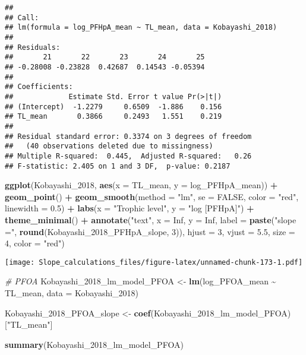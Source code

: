 \documentclass[
]{article}
\newenvironment{Shaded}{\begin{snugshade}}{\end{snugshade}}
\newcommand{\AttributeTok}[1]{\textcolor[rgb]{0.13,0.29,0.53}{#1}}
\newcommand{\CommentTok}[1]{\textcolor[rgb]{0.56,0.35,0.01}{\textit{#1}}}
\newcommand{\ConstantTok}[1]{\textcolor[rgb]{0.56,0.35,0.01}{#1}}
\newcommand{\DecValTok}[1]{\textcolor[rgb]{0.00,0.00,0.81}{#1}}
\newcommand{\FloatTok}[1]{\textcolor[rgb]{0.00,0.00,0.81}{#1}}
\newcommand{\FunctionTok}[1]{\textcolor[rgb]{0.13,0.29,0.53}{\textbf{#1}}}
\newcommand{\NormalTok}[1]{#1}
\newcommand{\OtherTok}[1]{\textcolor[rgb]{0.56,0.35,0.01}{#1}}
\newcommand{\SpecialCharTok}[1]{\textcolor[rgb]{0.81,0.36,0.00}{\textbf{#1}}}
\newcommand{\StringTok}[1]{\textcolor[rgb]{0.31,0.60,0.02}{#1}}
\begin{document}
\begin{verbatim}
## 
## Call:
## lm(formula = log_PFHpA_mean ~ TL_mean, data = Kobayashi_2018)
## 
## Residuals:
##       21       22       23       24       25 
## -0.28008 -0.23828  0.42687  0.14543 -0.05394 
## 
## Coefficients:
##             Estimate Std. Error t value Pr(>|t|)
## (Intercept)  -1.2279     0.6509  -1.886    0.156
## TL_mean       0.3866     0.2493   1.551    0.219
## 
## Residual standard error: 0.3374 on 3 degrees of freedom
##   (40 observations deleted due to missingness)
## Multiple R-squared:  0.445,  Adjusted R-squared:   0.26 
## F-statistic: 2.405 on 1 and 3 DF,  p-value: 0.2187
\end{verbatim}

\begin{Shaded}
\begin{Highlighting}[]
\FunctionTok{ggplot}\NormalTok{(Kobayashi\_2018, }\FunctionTok{aes}\NormalTok{(}\AttributeTok{x =}\NormalTok{ TL\_mean, }\AttributeTok{y =}\NormalTok{ log\_PFHpA\_mean)) }\SpecialCharTok{+}
  \FunctionTok{geom\_point}\NormalTok{() }\SpecialCharTok{+}
  \FunctionTok{geom\_smooth}\NormalTok{(}\AttributeTok{method =} \StringTok{"lm"}\NormalTok{, }\AttributeTok{se =} \ConstantTok{FALSE}\NormalTok{, }\AttributeTok{color =} \StringTok{"red"}\NormalTok{, }\AttributeTok{linewidth =} \FloatTok{0.5}\NormalTok{) }\SpecialCharTok{+}
  \FunctionTok{labs}\NormalTok{(}\AttributeTok{x =} \StringTok{"Trophic level"}\NormalTok{,}
       \AttributeTok{y =} \StringTok{"log [PFHpA]"}\NormalTok{) }\SpecialCharTok{+}
  \FunctionTok{theme\_minimal}\NormalTok{() }\SpecialCharTok{+}
  \FunctionTok{annotate}\NormalTok{(}\StringTok{"text"}\NormalTok{, }\AttributeTok{x =} \ConstantTok{Inf}\NormalTok{, }\AttributeTok{y =} \ConstantTok{Inf}\NormalTok{, }\AttributeTok{label =} \FunctionTok{paste}\NormalTok{(}\StringTok{"slope ="}\NormalTok{, }\FunctionTok{round}\NormalTok{(Kobayashi\_2018\_PFHpA\_slope, }\DecValTok{3}\NormalTok{)), }
           \AttributeTok{hjust =} \DecValTok{3}\NormalTok{, }\AttributeTok{vjust =} \FloatTok{5.5}\NormalTok{, }\AttributeTok{size =} \DecValTok{4}\NormalTok{, }\AttributeTok{color =} \StringTok{"red"}\NormalTok{)}
\end{Highlighting}
\end{Shaded}

\texttt{[image: Slope\_calculations\_files/figure-latex/unnamed-chunk-173-1.pdf]}

\begin{Shaded}
\begin{Highlighting}[]
\CommentTok{\# PFOA}
\NormalTok{Kobayashi\_2018\_lm\_model\_PFOA }\OtherTok{\textless{}{-}} \FunctionTok{lm}\NormalTok{(log\_PFOA\_mean }\SpecialCharTok{\textasciitilde{}}\NormalTok{ TL\_mean,}
                                    \AttributeTok{data =}\NormalTok{ Kobayashi\_2018)}

\NormalTok{Kobayashi\_2018\_PFOA\_slope }\OtherTok{\textless{}{-}} \FunctionTok{coef}\NormalTok{(Kobayashi\_2018\_lm\_model\_PFOA)[}\StringTok{"TL\_mean"}\NormalTok{]}

\FunctionTok{summary}\NormalTok{(Kobayashi\_2018\_lm\_model\_PFOA)}
\end{Highlighting}
\end{Shaded}
\end{document}
